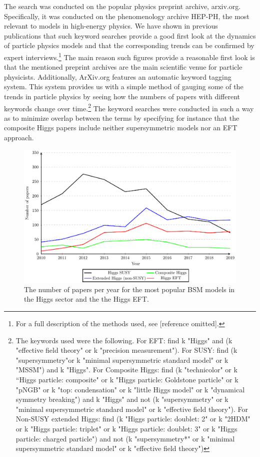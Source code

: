 The search was conducted on the popular physics preprint archive, arxiv.org.
Specifically, it was conducted on the phenomenology archive HEP-PH, the most relevant to models in high-energy physics.
We have shown in previous publications that such keyword searches provide a good first look at the dynamics of particle physics models and that the corresponding trends can be confirmed by expert interviews.\footnote{For a full description of the methods used, see [reference omitted].}
The main reason such figures provide a reasonable first look is that the mentioned preprint archives are the main scientific venue for particle physicists.
Additionally, ArXiv.org features an automatic keyword tagging system.
This system provides us with a simple method of gauging some of the trends in particle physics by seeing how the numbers of papers with different keywords change over time.\footnote{The keywords used were the following. For EFT: find k "Higgs" and (k "effective field theory" or k "precision measurement"). For SUSY: find (k "supersymmetry"or k "minimal supersymmetric standard model" or k "MSSM") and k "Higgs". For Composite Higgs: find (k "technicolor" or k “Higgs particle: composite" or k "Higgs particle: Goldstone particle" or k "pNGB" or k "top: condensation" or k "little Higgs model" or k "dynamical symmetry breaking") and k "Higgs" and not (k "supersymmetry" or k "minimal supersymmetric standard model" or k "effective field theory"). For Non-SUSY extended Higgs: find (k "Higgs particle: doublet: 2" or k "2HDM" or k "Higgs particle: triplet" or k "Higgs particle: doublet: 3" or k "Higgs particle: charged particle") and not (k "supersymmetry*" or k "minimal supersymmetric standard model" or k "effective field theory") }
The keyword searches were conducted in such a way as to minimize overlap between the terms by specifying for instance that the composite Higgs papers include neither supersymmetric models nor an EFT approach. 
\begin{figure}
\includegraphics[width=\textwidth]{susyeft_2107}
\caption{The number of papers per year for the most popular BSM models in the Higgs sector and the the Higgs EFT.} 
\label{fig:lineplot}
\end{figure}

